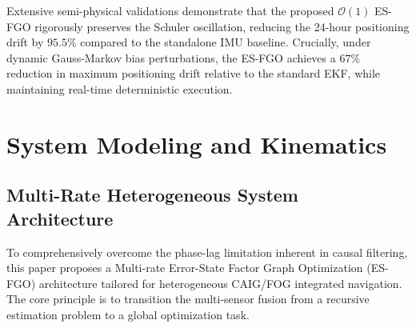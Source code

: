 \documentclass[journal]{IEEEtran}
\begin{document}
	Extensive semi-physical validations demonstrate that the proposed $\mathcal{O}(1)$ ES-FGO rigorously preserves the Schuler oscillation, reducing the 24-hour positioning drift by $95.5\%$ compared to the standalone IMU baseline. Crucially, under dynamic Gauss-Markov bias perturbations, the ES-FGO achieves a $67\%$ reduction in maximum positioning drift relative to the standard EKF, while maintaining real-time deterministic execution.
	
	
	
	\section{System Modeling and Kinematics}
	
	\subsection{Multi-Rate Heterogeneous System Architecture}
	To comprehensively overcome the phase-lag limitation inherent in causal filtering, this paper proposes a Multi-rate Error-State Factor Graph Optimization (ES-FGO) architecture tailored for heterogeneous CAIG/FOG integrated navigation. The core principle is to transition the multi-sensor fusion from a recursive estimation problem to a global optimization task. 
	
\end{document}
